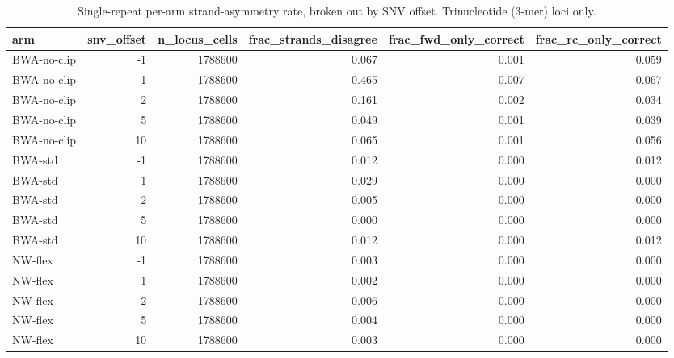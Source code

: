 \begin{table}
\caption{Single-repeat per-arm strand-asymmetry rate, broken out by SNV offset.  Trinucleotide (3-mer) loci only.}
\label{tab:single-strand-asymmetry}
\begin{tabular}{lrrrrr}
\toprule
arm & snv_offset & n_locus_cells & frac_strands_disagree & frac_fwd_only_correct & frac_rc_only_correct \\
\midrule
BWA-no-clip & -1 & 1788600 & 0.067 & 0.001 & 0.059 \\
BWA-no-clip & 1 & 1788600 & 0.465 & 0.007 & 0.067 \\
BWA-no-clip & 2 & 1788600 & 0.161 & 0.002 & 0.034 \\
BWA-no-clip & 5 & 1788600 & 0.049 & 0.001 & 0.039 \\
BWA-no-clip & 10 & 1788600 & 0.065 & 0.001 & 0.056 \\
BWA-std & -1 & 1788600 & 0.012 & 0.000 & 0.012 \\
BWA-std & 1 & 1788600 & 0.029 & 0.000 & 0.000 \\
BWA-std & 2 & 1788600 & 0.005 & 0.000 & 0.000 \\
BWA-std & 5 & 1788600 & 0.000 & 0.000 & 0.000 \\
BWA-std & 10 & 1788600 & 0.012 & 0.000 & 0.012 \\
NW-flex & -1 & 1788600 & 0.003 & 0.000 & 0.000 \\
NW-flex & 1 & 1788600 & 0.002 & 0.000 & 0.000 \\
NW-flex & 2 & 1788600 & 0.006 & 0.000 & 0.000 \\
NW-flex & 5 & 1788600 & 0.004 & 0.000 & 0.000 \\
NW-flex & 10 & 1788600 & 0.003 & 0.000 & 0.000 \\
\bottomrule
\end{tabular}
\end{table}

